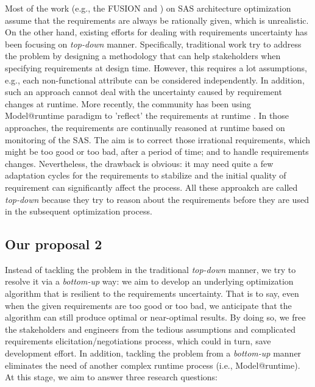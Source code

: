 \documentclass[DIV15,a4paper]{scrartcl}
\begin{document}
Most of the work (e.g., the FUSION \cite{Elkhodary:2010} and \cite{Esfahani:2011}) on SAS architecture optimization assume that the requirements are always be rationally given, which is unrealistic. On the other hand, existing efforts for dealing with requirements uncertainty has been focusing on \emph{top-down} manner. Specifically, traditional work try to address the problem by designing a methodology that can help stakeholders when specifying requirements \cite{1317482} at design time. However, this requires a lot assumptions, e.g., each non-functional attribute can be considered independently. In addition, such an approach cannot deal with the uncertainty caused by requirement changes at runtime. More recently, the community has been using Model@runtime paradigm to 'reflect' the requirements at runtime \cite{Song2013}. In those approaches, the requirements are continually reasoned at runtime based on monitoring of the SAS. The aim is to correct those irrational requirements, which might be too good or too bad, after a period of time; and to handle requirements changes. Nevertheless, the drawback is obvious: it may need quite a few adaptation cycles for the requirements to stabilize and the initial quality of requirement can significantly affect the process. All these approakch are called \emph{top-down} because they try to reason about the requirements before they are used in the subsequent optimization process.

\subsection{Our proposal 2}

Instead of tackling the problem in the traditional  \emph{top-down} manner, we try to resolve it via a  \emph{bottom-up} way: we aim to develop an underlying optimization algorithm that is resilient to the requirements uncertainty. That is to say, even when the given requirements are too good or too bad, we anticipate that the algorithm can still produce optimal or near-optimal results. By doing so, we free the stakeholders and engineers from the tedious assumptions and complicated requirements elicitation/negotiations process, which could in turn, save development effort. In addition, tackling the problem from a \emph{bottom-up} manner eliminates the need of another complex runtime process (i.e., Model@runtime). At this stage, we aim to answer three research questions:
\end{document}
